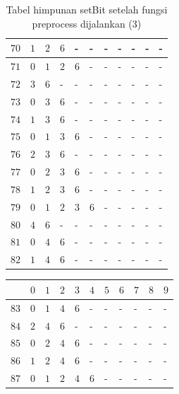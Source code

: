 \begin{appendices}
\begin{table}[H]
\begin{tabular} {|l|l|l|l|l|l|l|l|l|l|l|}
  		$ 70 $ & $ 1 $ &$ 2 $ &$ 6 $ & - &  - &  - &  - &  - &  - &  -   \\ \hline
  		$ 71 $ & $ 0 $ &$ 1 $ &$ 2 $ &$ 6 $ & - &  - &  - &  - &  - &  -   \\ \hline
  		$ 72 $ & $ 3 $ &$ 6 $ & - &  - &  - &  - &  - &  - &  - &  -   \\ \hline
  		$ 73 $ & $ 0 $ &$ 3 $ &$ 6 $ & - &  - &  - &  - &  - &  - &  -   \\ \hline
  		$ 74 $ & $ 1 $ &$ 3 $ &$ 6 $ & - &  - &  - &  - &  - &  - &  -   \\ \hline
  		$ 75 $ & $ 0 $ &$ 1 $ &$ 3 $ &$ 6 $ & - &  - &  - &  - &  - &  -   \\ \hline
  		$ 76 $ & $ 2 $ &$ 3 $ &$ 6 $ & - &  - &  - &  - &  - &  - &  -   \\ \hline
  		$ 77 $ & $ 0 $ &$ 2 $ &$ 3 $ &$ 6 $ & - &  - &  - &  - &  - &  -   \\ \hline
  		$ 78 $ & $ 1 $ &$ 2 $ &$ 3 $ &$ 6 $ & - &  - &  - &  - &  - &  -   \\ \hline
  		$ 79 $ & $ 0 $ &$ 1 $ &$ 2 $ &$ 3 $ &$ 6 $ & - &  - &  - &  - &  -   \\ \hline
  		$ 80 $ & $ 4 $ &$ 6 $ & - &  - &  - &  - &  - &  - &  - &  -   \\ \hline
  		$ 81 $ & $ 0 $ &$ 4 $ &$ 6 $ & - &  - &  - &  - &  - &  - &  -   \\ \hline
  		$ 82 $ & $ 1 $ &$ 4 $ &$ 6 $ & - &  - &  - &  - &  - &  - &  -   \\ \hline  		
  	\end{tabular}\caption{Tabel himpunan setBit setelah fungsi preprocess dijalankan (3)}
  	\label{tab:setbit_3}
  \end{table}
  \begin{table}[H]
  	\centering
  	\begin{tabular} {|l|l|l|l|l|l|l|l|l|l|l|} \hline
  		\backslashbox{$Num$}{$index$} & $ 0 $ & $ 1 $ & $ 2 $ & $ 3 $ & $ 4 $ & $ 5 $ & $ 6 $ & $ 7 $ & $ 8 $ & $ 9 $ \\ \hline
  		$ 83 $ & $ 0 $ &$ 1 $ &$ 4 $ &$ 6 $ & - &  - &  - &  - &  - &  -   \\ \hline
  		$ 84 $ & $ 2 $ &$ 4 $ &$ 6 $ & - &  - &  - &  - &  - &  - &  -   \\ \hline
  		$ 85 $ & $ 0 $ &$ 2 $ &$ 4 $ &$ 6 $ & - &  - &  - &  - &  - &  -   \\ \hline
  		$ 86 $ & $ 1 $ &$ 2 $ &$ 4 $ &$ 6 $ & - &  - &  - &  - &  - &  -   \\ \hline
  		$ 87 $ & $ 0 $ &$ 1 $ &$ 2 $ &$ 4 $ &$ 6 $ & - &  - &  - &  - &  -   \\ \hline

\end{tabular}
\end{table}
\end{appendices}

